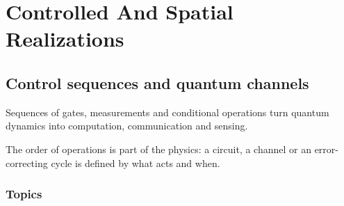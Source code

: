 \documentclass[11pt,oneside]{book}
\begin{document}
\part{Controlled And Spatial Realizations}

\chapter{Control sequences and quantum channels}

Sequences of gates, measurements and conditional operations turn quantum dynamics into computation, communication and sensing.

The order of operations is part of the physics: a circuit, a channel or an error-correcting cycle is defined by what acts and when.

\section*{Topics}
\end{document}
